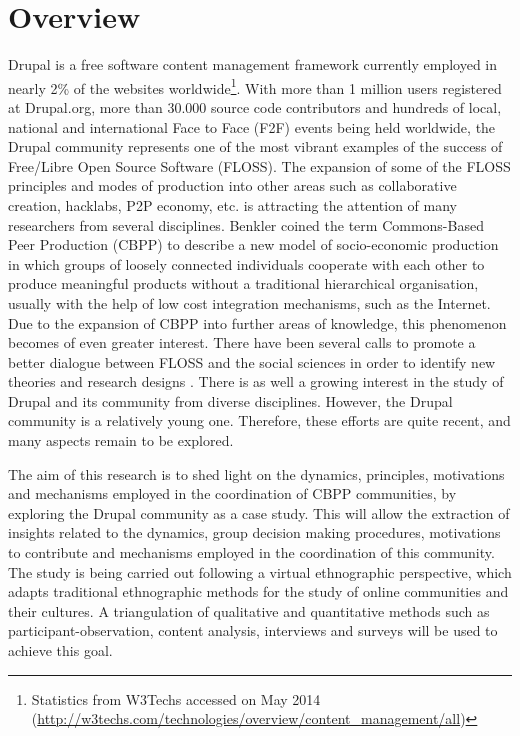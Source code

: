 \documentclass{sig-alternate}
\begin{document}
\section{Overview}
Drupal is a free software content management framework currently employed in nearly 2\% of the websites worldwide\footnote{Statistics from W3Techs accessed on May 2014 (\url{http://w3techs.com/technologies/overview/content_management/all})}.
  With more than 1 million users registered at Drupal.org, more than 30.000 source code contributors and hundreds of local, national and international Face to Face (F2F) events  being held worldwide, the Drupal community represents one of the most vibrant examples of the success of Free/Libre Open Source Software (FLOSS). The expansion of some of the FLOSS principles and modes of production into other areas such as collaborative creation, hacklabs, P2P economy, etc. is attracting the attention of many researchers from several disciplines. Benkler\cite{benkler2006wealth} coined the term Commons-Based Peer Production (CBPP) to describe a new model of socio-economic production in which groups of loosely connected individuals cooperate with each other to produce meaningful products without a traditional hierarchical organisation, usually with the help of low cost integration mechanisms, such as the Internet. Due to the expansion of CBPP into further areas of knowledge, this phenomenon becomes of even greater interest. There have been several calls to promote a better dialogue between FLOSS and the social sciences in order to identify new theories and research designs \cite{VonKrogh2007}. There is as well a growing interest in the study of Drupal and its community from diverse disciplines. However, the Drupal community is a relatively young one. Therefore, these efforts are quite recent, and many aspects remain to be explored.

The aim of this research is to shed light on the dynamics, principles, motivations and mechanisms employed in the coordination of CBPP communities, by exploring the Drupal community as a case study.  This  will allow the extraction of insights related to the dynamics, group decision making procedures, motivations to contribute and mechanisms employed in the coordination of this community. The study is being carried out following a virtual ethnographic perspective\cite{hine2000virtual}, which adapts traditional ethnographic methods for the study of online communities and their cultures. A triangulation of qualitative and quantitative methods such as participant-observation, content analysis, interviews and surveys will be used to achieve this goal.
\end{document}
